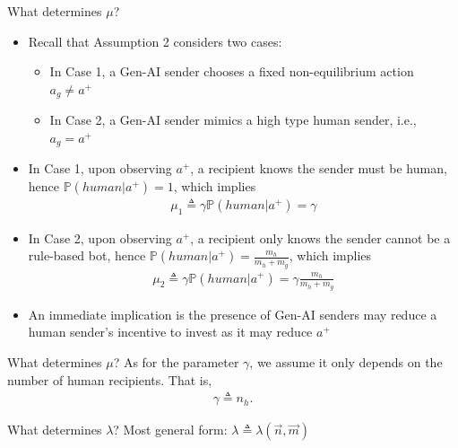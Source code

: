 \documentclass[9pt]{beamer}
\begin{document}
\begin{frame}{What determines $\mu$?}
\begin{itemize}\setlength{\itemsep}{1em}
    \item Recall that Assumption 2 considers two cases:
    \begin{itemize}
        \item In Case 1, a Gen-AI sender chooses a fixed non-equilibrium action $a_g\neq a^+$
        \item In Case 2, a Gen-AI sender mimics a high type human sender, i.e., $a_g= a^+$
    \end{itemize}
    \item In Case 1, upon observing $a^+$, a recipient knows the sender must be human, hence $\mathbb{P}(human|a^+)=1$, which implies 
    \begin{align*}
        \mu_1 \triangleq \gamma \mathbb{P}(human|a^+) = \gamma
    \end{align*}
    \item In Case 2, upon observing $a^+$, a recipient only knows the sender cannot be a rule-based bot, hence $\mathbb{P}(human|a^+)=\frac{m_h}{m_h+m_g}$, which implies 
    \begin{align*}
        \mu_2\triangleq \gamma \mathbb{P}(human|a^+) = \gamma \frac{m_h}{m_h+m_g}
    \end{align*}
    \item An immediate implication is the presence of Gen-AI senders may reduce a human sender's incentive to invest as it may reduce $a^+$ 
\end{itemize}
\end{frame}


\begin{frame}{What determines $\mu$?}
As for the parameter $\gamma$, we assume it only depends on the number of human recipients. That is,
\begin{align*}
    \gamma \triangleq n_h.
\end{align*}
\end{frame}

\begin{frame}{What determines $\lambda$?}
Most general form: $\lambda \triangleq \lambda(\vec{n},\vec{m})$
\end{frame}
\end{document}
